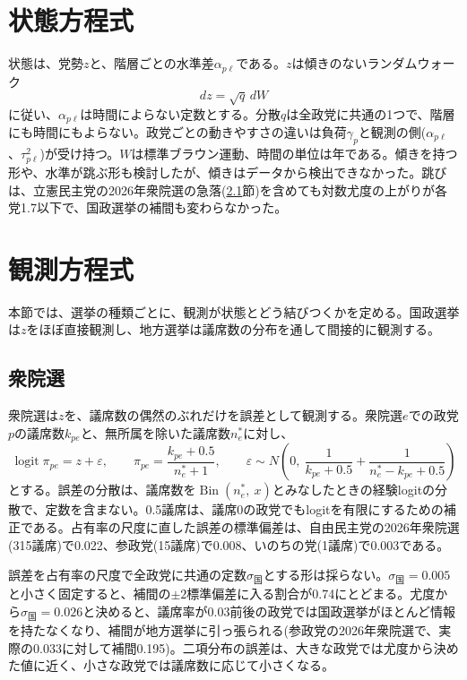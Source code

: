 \documentclass[a4paper,11pt]{ltjsarticle}
\begin{document}
\section{状態方程式}

状態は、党勢$z$と、階層ごとの水準差$\alpha_{p\ell}$である。$z$は傾きのないランダムウォーク
\begin{equation}
  dz = \sqrt{q}\,dW
\end{equation}
に従い、$\alpha_{p\ell}$は時間によらない定数とする。分散$q$は全政党に共通の1つで、階層にも時間にもよらない。政党ごとの動きやすさの違いは負荷$\gamma_p$と観測の側($\alpha_{p\ell}$、$\tau^2_{p\ell}$)が受け持つ。$W$は標準ブラウン運動、時間の単位は年である。傾きを持つ形や、水準が跳ぶ形も検討したが、傾きはデータから検出できなかった。跳びは、立憲民主党の2026年衆院選の急落(\ref{sec:shu}節)を含めても対数尤度の上がりが各党1.7以下で、国政選挙の補間も変わらなかった。

\section{観測方程式}

本節では、選挙の種類ごとに、観測が状態とどう結びつくかを定める。国政選挙は$z$をほぼ直接観測し、地方選挙は議席数の分布を通して間接的に観測する。

\subsection{衆院選}
\label{sec:shu}

衆院選は$z$を、議席数の偶然のぶれだけを誤差として観測する。衆院選$e$での政党$p$の議席数$k_{pe}$と、無所属を除いた議席数$n^\ast_e$に対し、
\begin{equation}
  \operatorname{logit}\pi_{pe} = z + \varepsilon,\qquad
  \pi_{pe}=\frac{k_{pe}+0.5}{n^\ast_e+1},\qquad
  \varepsilon\sim N\!\left(0,\ \frac{1}{k_{pe}+0.5}+\frac{1}{n^\ast_e-k_{pe}+0.5}\right)
\end{equation}
とする。誤差の分散は、議席数を$\operatorname{Bin}(n^\ast_e,\ x)$とみなしたときの経験logitの分散で、定数を含まない。0.5議席は、議席0の政党でもlogitを有限にするための補正である。占有率の尺度に直した誤差の標準偏差は、自由民主党の2026年衆院選(315議席)で0.022、参政党(15議席)で0.008、いのちの党(1議席)で0.003である。

誤差を占有率の尺度で全政党に共通の定数$\sigma_{\text{国}}$とする形は採らない。$\sigma_{\text{国}}=0.005$と小さく固定すると、補間の$\pm2$標準偏差に入る割合が0.74にとどまる。尤度から$\sigma_{\text{国}}=0.026$と決めると、議席率が0.03前後の政党では国政選挙がほとんど情報を持たなくなり、補間が地方選挙に引っ張られる(参政党の2026年衆院選で、実際の0.033に対して補間0.195)。二項分布の誤差は、大きな政党では尤度から決めた値に近く、小さな政党では議席数に応じて小さくなる。
\end{document}
